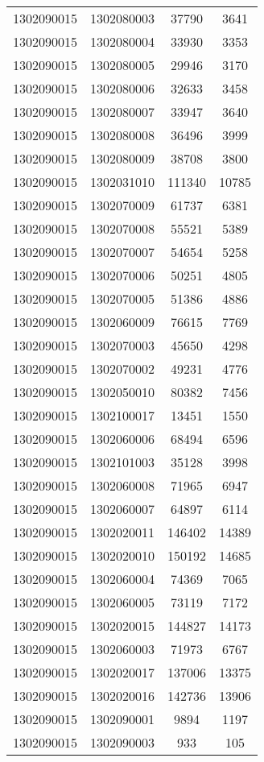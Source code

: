 \begin{longtable}[h]{llcc}
		1302090015 & 1302080003 & 37790 & 3641\\
		1302090015 & 1302080004 & 33930 & 3353\\
		1302090015 & 1302080005 & 29946 & 3170\\
		1302090015 & 1302080006 & 32633 & 3458\\
		1302090015 & 1302080007 & 33947 & 3640\\
		1302090015 & 1302080008 & 36496 & 3999\\
		1302090015 & 1302080009 & 38708 & 3800\\
		1302090015 & 1302031010 & 111340 & 10785\\
		1302090015 & 1302070009 & 61737 & 6381\\
		1302090015 & 1302070008 & 55521 & 5389\\
		1302090015 & 1302070007 & 54654 & 5258\\
		1302090015 & 1302070006 & 50251 & 4805\\
		1302090015 & 1302070005 & 51386 & 4886\\
		1302090015 & 1302060009 & 76615 & 7769\\
		1302090015 & 1302070003 & 45650 & 4298\\
		1302090015 & 1302070002 & 49231 & 4776\\
		1302090015 & 1302050010 & 80382 & 7456\\
		1302090015 & 1302100017 & 13451 & 1550\\
		1302090015 & 1302060006 & 68494 & 6596\\
		1302090015 & 1302101003 & 35128 & 3998\\
		1302090015 & 1302060008 & 71965 & 6947\\
		1302090015 & 1302060007 & 64897 & 6114\\
		1302090015 & 1302020011 & 146402 & 14389\\
		1302090015 & 1302020010 & 150192 & 14685\\
		1302090015 & 1302060004 & 74369 & 7065\\
		1302090015 & 1302060005 & 73119 & 7172\\
		1302090015 & 1302020015 & 144827 & 14173\\
		1302090015 & 1302060003 & 71973 & 6767\\
		1302090015 & 1302020017 & 137006 & 13375\\
		1302090015 & 1302020016 & 142736 & 13906\\
		1302090015 & 1302090001 & 9894 & 1197\\
		1302090015 & 1302090003 & 933 & 105\\

\end{longtable}
